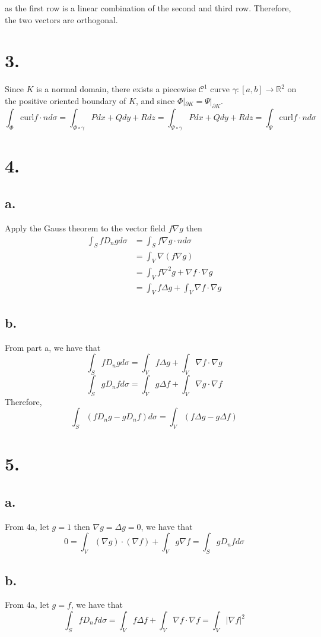 \documentclass[11pt]{article}
\begin{document}
as the first row is a linear combination of the second and third row. Therefore, the two vectors are orthogonal.
\pagebreak
\section*{3.}
Since $K$ is a normal domain, 
there exists a piecewise $\mathcal{C}^1$ curve 
$\gamma: [a,b] \to \mathbb{R}^2$ on the positive oriented boundary of $K$, and since $\Phi|_{\partial K} = \Psi|_{\partial K}$. \\
\[
    \int_{\Phi} \text{curl} f \cdot n d\sigma = \int_{\Phi \circ \gamma} Pdx + Qdy + Rdz = \int_{\Psi \circ \gamma} Pdx + Qdy + Rdz = \int_{\Psi} \text{curl} f \cdot n d\sigma 
\]
\pagebreak
\section*{4.}
\subsection*{a.}
Apply the Gauss theorem to the vector field $f\nabla g$ then
\begin{equation*}
    \begin{aligned}
        \int_S f D_n g d\sigma &=  \int_S f \nabla g \cdot n d\sigma \\
        & = \int_V \nabla (f \nabla g) \\
        & = \int_V f \nabla^2 g + \nabla f \cdot \nabla g \\
        & = \int_V f \Delta g + \int_V \nabla f \cdot \nabla g
    \end{aligned}
\end{equation*}
\subsection*{b.}
From part a, we have that 
\[
    \int_S f D_n g d\sigma = \int_V f \Delta g + \int_V \nabla f \cdot \nabla g    
\]
\[
    \int_S g D_n f d\sigma = \int_V g \Delta f + \int_V \nabla g \cdot \nabla f
\]
Therefore, 
\[
    \int_S (f D_n g - g D_n f) d\sigma = \int_V (f \Delta g - g \Delta f)
\]
\pagebreak
\section*{5.}
\subsection*{a.}
From 4a, let $g=1$ then $\nabla g = \Delta g = 0$, we have that 
\[
    0 = \int_V (\nabla g) \cdot (\nabla f) + \int_V g \nabla f = \int_S g D_n f d\sigma
\]
\subsection*{b.}
From 4a, let $g = f$, we have that 
\[
    \int_S f D_n f d\sigma = \int_V f \Delta f + \int_V \nabla f \cdot \nabla f = \int_V |\nabla f|^2
\]
\end{document}

